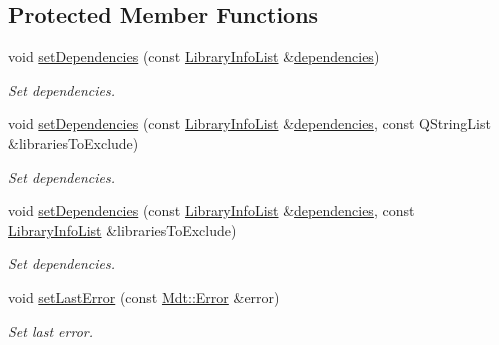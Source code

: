 \subsection*{Protected Member Functions}
\begin{DoxyCompactItemize}
\item 
void \hyperlink{class_mdt_1_1_deploy_utils_1_1_binary_dependencies_implementation_interface_ae2d803dbc00c79897a9f42b4bc02996c}{set\+Dependencies} (const \hyperlink{class_mdt_1_1_deploy_utils_1_1_library_info_list}{Library\+Info\+List} \&\hyperlink{class_mdt_1_1_deploy_utils_1_1_binary_dependencies_implementation_interface_a2efebdcc70b6a43a23bc1908d94f4dc3}{dependencies})
\begin{DoxyCompactList}\small\item\em Set dependencies. \end{DoxyCompactList}\item 
void \hyperlink{class_mdt_1_1_deploy_utils_1_1_binary_dependencies_implementation_interface_ad089fb5f39dce89341d8150d61d2454d}{set\+Dependencies} (const \hyperlink{class_mdt_1_1_deploy_utils_1_1_library_info_list}{Library\+Info\+List} \&\hyperlink{class_mdt_1_1_deploy_utils_1_1_binary_dependencies_implementation_interface_a2efebdcc70b6a43a23bc1908d94f4dc3}{dependencies}, const Q\+String\+List \&libraries\+To\+Exclude)
\begin{DoxyCompactList}\small\item\em Set dependencies. \end{DoxyCompactList}\item 
void \hyperlink{class_mdt_1_1_deploy_utils_1_1_binary_dependencies_implementation_interface_a5b641a5c61958ed07655a09ef2937996}{set\+Dependencies} (const \hyperlink{class_mdt_1_1_deploy_utils_1_1_library_info_list}{Library\+Info\+List} \&\hyperlink{class_mdt_1_1_deploy_utils_1_1_binary_dependencies_implementation_interface_a2efebdcc70b6a43a23bc1908d94f4dc3}{dependencies}, const \hyperlink{class_mdt_1_1_deploy_utils_1_1_library_info_list}{Library\+Info\+List} \&libraries\+To\+Exclude)
\begin{DoxyCompactList}\small\item\em Set dependencies. \end{DoxyCompactList}\item 
void \hyperlink{class_mdt_1_1_deploy_utils_1_1_binary_dependencies_implementation_interface_a9745c52d6c7ebabee2e8b11eb80c3684}{set\+Last\+Error} (const \hyperlink{class_mdt_1_1_error}{Mdt\+::\+Error} \&error)
\begin{DoxyCompactList}\small\item\em Set last error. \end{DoxyCompactList}\end{DoxyCompactItemize}


